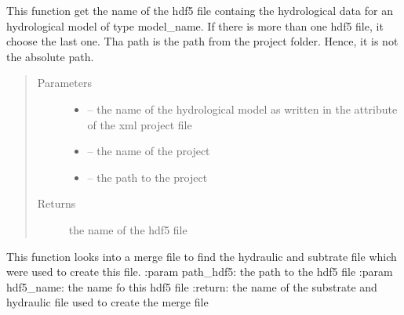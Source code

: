 \documentclass[letterpaper,10pt,english]{sphinxmanual}
\begin{document}
\begin{fulllineitems}
\label{\detokenize{index:src.load_hdf5.get_hdf5_name}}
This function get the name of the hdf5 file containg the hydrological data for an hydrological model of type
model\_name. If there is more than one hdf5 file, it choose the last one. Tha path is the path from the
project folder. Hence, it is not the absolute path.
\begin{quote}\begin{description}
\item[{Parameters}] \leavevmode\begin{itemize}
\item {} 
 -- the name of the hydrological model as written in the attribute of the xml project file

\item {} 
 -- the name of the project

\item {} 
 -- the path to the project

\end{itemize}

\item[{Returns}] \leavevmode
the name of the hdf5 file

\end{description}\end{quote}

\end{fulllineitems}


\begin{fulllineitems}
\label{\detokenize{index:src.load_hdf5.get_initial_files}}
This function looks into a merge file to find the hydraulic and subtrate file which
were used to create this file.
:param path\_hdf5: the path to the hdf5 file
:param hdf5\_name: the name fo this hdf5 file
:return: the name of the substrate and hydraulic file used to create the merge file

\end{fulllineitems}

\end{document}
